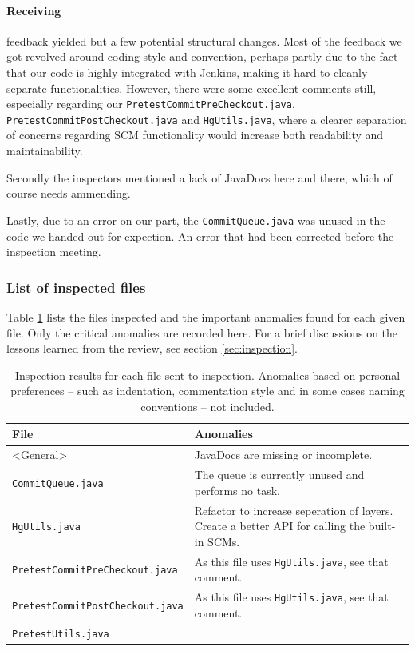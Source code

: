 \documentclass[a4paper]{article}
\begin{document}
\paragraph{Receiving} feedback yielded but a few potential structural changes. Most
of the feedback we got revolved around coding style and convention, perhaps
partly due to the fact that our code is highly integrated with Jenkins, making
it hard to cleanly separate functionalities. However, there were some excellent
comments still, especially regarding our \texttt{PretestCommitPreCheckout.java},
\texttt{PretestCommitPostCheckout.java} and \texttt{HgUtils.java}, where a
clearer separation of concerns regarding SCM functionality would increase both
readability and maintainability.

Secondly the inspectors mentioned a lack of JavaDocs here and there, which of
course needs ammending.

Lastly, due to an error on our part, the \texttt{CommitQueue.java} was unused in
the code we handed out for expection. An error that had been corrected before
the inspection meeting.

\subsubsection{List of inspected files}
Table \ref{tab:inspection} lists the files inspected and the important anomalies
found for each given file. Only the critical anomalies are recorded here. For a
brief discussions on the lessons learned from the review, see section
\ref{sec:inspection}.

\begin{table}[!ht]
	\centering
	\begin{tabular}{| p{6cm} | p{5cm} |}
			\hline
			\textbf{File}&\textbf{Anomalies} \\
			\hline
			<General> & JavaDocs are missing or incomplete. \\
			\hline
			\texttt{CommitQueue.java} &
				The queue is currently unused and performs no task.\\
			\hline
			\texttt{HgUtils.java} &
				Refactor to increase seperation of layers. Create a better API
				for calling the built-in SCMs.\\
			\hline
			\texttt{PretestCommitPreCheckout.java} &
				As this file uses \texttt{HgUtils.java}, see that comment. \\
			\hline
			\texttt{PretestCommitPostCheckout.java} &
				As this file uses \texttt{HgUtils.java}, see that comment. \\
			\hline
			\texttt{PretestUtils.java} & \\
			\hline
		\end{tabular}
		\caption{Inspection results for each file sent to inspection. Anomalies based
		on personal preferences -- such as indentation, commentation style and in some
		cases naming conventions -- not included.}
		\label{tab:inspection}
\end{table}
\end{document}
